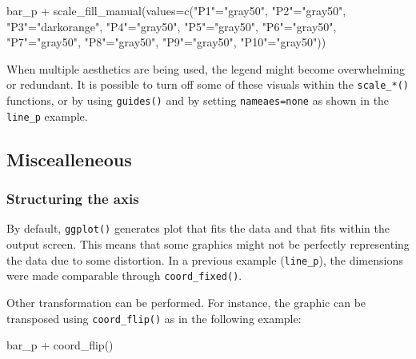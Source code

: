 \documentclass[
]{book}
\newenvironment{Shaded}{\begin{snugshade}}{\end{snugshade}}
\newcommand{\AttributeTok}[1]{\textcolor[rgb]{0.77,0.63,0.00}{#1}}
\newcommand{\FunctionTok}[1]{\textcolor[rgb]{0.00,0.00,0.00}{#1}}
\newcommand{\NormalTok}[1]{#1}
\newcommand{\OtherTok}[1]{\textcolor[rgb]{0.56,0.35,0.01}{#1}}
\newcommand{\SpecialCharTok}[1]{\textcolor[rgb]{0.00,0.00,0.00}{#1}}
\newcommand{\StringTok}[1]{\textcolor[rgb]{0.31,0.60,0.02}{#1}}
\begin{document}
\begin{Shaded}
\begin{Highlighting}[]
\NormalTok{bar\_p }\SpecialCharTok{+} 
  \FunctionTok{scale\_fill\_manual}\NormalTok{(}\AttributeTok{values=}\FunctionTok{c}\NormalTok{(}\StringTok{"P1"}\OtherTok{=}\StringTok{"gray50"}\NormalTok{, }\StringTok{"P2"}\OtherTok{=}\StringTok{"gray50"}\NormalTok{, }\StringTok{"P3"}\OtherTok{=}\StringTok{"darkorange"}\NormalTok{, }\StringTok{"P4"}\OtherTok{=}\StringTok{"gray50"}\NormalTok{, }\StringTok{"P5"}\OtherTok{=}\StringTok{"gray50"}\NormalTok{,}
                             \StringTok{"P6"}\OtherTok{=}\StringTok{"gray50"}\NormalTok{, }\StringTok{"P7"}\OtherTok{=}\StringTok{"gray50"}\NormalTok{, }\StringTok{"P8"}\OtherTok{=}\StringTok{"gray50"}\NormalTok{, }\StringTok{"P9"}\OtherTok{=}\StringTok{"gray50"}\NormalTok{, }\StringTok{"P10"}\OtherTok{=}\StringTok{"gray50"}\NormalTok{))}
\end{Highlighting}
\end{Shaded}

When multiple aesthetics are being used, the legend might become overwhelming or redundant. It is possible to turn off some of these visuals within the \texttt{scale\_*()} functions, or by using \texttt{guides()} and by setting \texttt{nameaes=\textquotesingle{}none\textquotesingle{}} as shown in the \texttt{line\_p} example.

\hypertarget{miscealleneous}{%
\subsection{Miscealleneous}\label{miscealleneous}}

\hypertarget{structuring-the-axis}{%
\subsubsection{Structuring the axis}\label{structuring-the-axis}}

By default, \texttt{ggplot()} generates plot that fits the data and that fits within the output screen. This means that some graphics might not be perfectly representing the data due to some distortion. In a previous example (\texttt{line\_p}), the dimensions were made comparable through \texttt{coord\_fixed()}.

Other transformation can be performed. For instance, the graphic can be transposed using \texttt{coord\_flip()} as in the following example:

\begin{Shaded}
\begin{Highlighting}[]
\NormalTok{bar\_p }\SpecialCharTok{+} \FunctionTok{coord\_flip}\NormalTok{()}
\end{Highlighting}
\end{Shaded}
\end{document}
